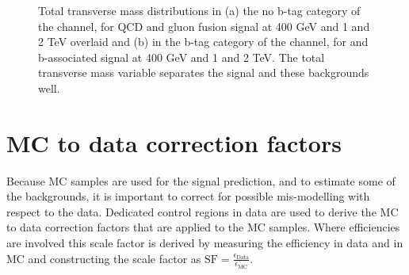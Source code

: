\begin{figure}[h!]
\begin{center}
\end{center}
\caption[Total transverse mass distributions in the no b-tag category of the
\tautau channel for QCD and gluon fusion signal, and in the b-tag category
of the \emu channel, for \ttbar and b-associated signal.]{Total transverse mass distributions in (a) the no b-tag category of the \tautau
channel, for QCD and gluon fusion signal at 400 GeV and 1 and 2 TeV overlaid and (b) in the b-tag
category of the \emu channel, for \ttbar and b-associated signal at 400 GeV and 1 and 2 TeV. 
The total transverse mass variable separates the signal and these backgrounds well.}
\label{fig:mttot_sigseps}
\end{figure}



\section{\ac{MC} to data correction factors}
\label{sec:mssm_mccorrs}
Because \ac{MC} samples are used for the signal prediction, and 
to estimate some of the backgrounds, it is important to correct for possible 
mis-modelling with respect to the data. Dedicated control regions in
data are used to derive the \ac{MC} to data correction factors
that are applied to the \ac{MC} samples. Where efficiencies
are involved this scale factor is derived by measuring the efficiency
in data and in \ac{MC} and constructing the scale factor as $\text{SF}=\frac{\epsilon_{\text{Data}}}{\epsilon_{\text{MC}}}$.
